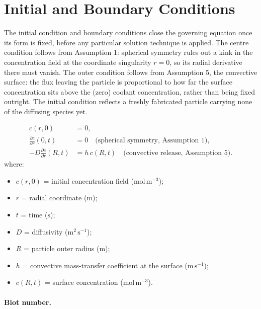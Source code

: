 \documentclass[11pt,a4paper]{article}
\begin{document}
\section{Initial and Boundary Conditions}
\label{sec:icbc}

The initial condition and boundary conditions close the governing equation
once its form is fixed, before any particular solution technique is
applied. The centre condition follows from Assumption 1: spherical symmetry
rules out a kink in the concentration field at the coordinate singularity
$r=0$, so its radial derivative there must vanish. The outer condition
follows from Assumption 5, the convective surface: the flux leaving the
particle is proportional to how far the surface concentration sits above
the (zero) coolant concentration, rather than being fixed outright. The
initial condition reflects a freshly fabricated particle carrying none of
the diffusing species yet.

\begin{align}
c(r,0) &= 0, \label{eq:b:ic}\\
\frac{\partial c}{\partial r}(0,t) &= 0 \quad\text{(spherical symmetry, Assumption 1)}, \label{eq:b:bc0}\\
-D\frac{\partial c}{\partial r}(R,t) &= h\,c(R,t) \quad\text{(convective release, Assumption 5)}. \label{eq:b:bcR}
\end{align}
\vspace{-0.3em}
\noindent where:

\begin{itemize}[leftmargin=1.6em,itemsep=1pt,topsep=3pt,parsep=0pt]
  \item $c(r,0)$ = initial concentration field ($\mathrm{mol\,m^{-3}}$);
  \item $r$ = radial coordinate ($\mathrm{m}$);
  \item $t$ = time ($\mathrm{s}$);
  \item $D$ = diffusivity ($\mathrm{m^{2}\,s^{-1}}$);
  \item $R$ = particle outer radius ($\mathrm{m}$);
  \item $h$ = convective mass-transfer coefficient at the surface ($\mathrm{m\,s^{-1}}$);
  \item $c(R,t)$ = surface concentration ($\mathrm{mol\,m^{-3}}$).
\end{itemize}

\paragraph{Biot number.}
\end{document}
